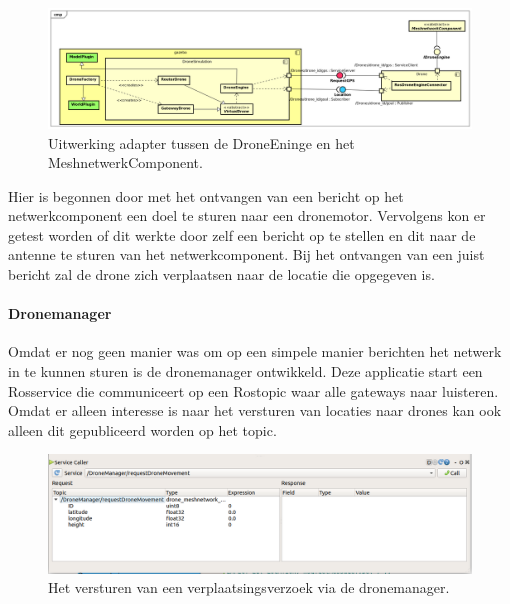 \documentclass[a4paper, 11pt, oneside]{report}
\begin{document}
\begin{figure}[H]
	\begin{center}\includegraphics[width=1\linewidth]{Afbeeldingen/RosEngineAdapater.png}\end{center}
	\caption{Uitwerking adapter tussen de DroneEninge en het MeshnetwerkComponent.}
	\label{fig:adapter}
\end{figure}

Hier is begonnen door met het ontvangen van een bericht op het netwerkcomponent een doel te sturen naar een dronemotor. Vervolgens kon er getest worden of dit werkte door zelf een bericht op te stellen en dit naar de antenne te sturen van het netwerkcomponent. 
Bij het ontvangen van een juist bericht zal de drone zich verplaatsen naar de locatie die opgegeven is.

\paragraph{Dronemanager}
Omdat er nog geen manier was om op een simpele manier berichten het netwerk in te kunnen sturen is de dronemanager ontwikkeld. Deze applicatie start een Rosservice die communiceert op een Rostopic waar alle gateways naar luisteren. Omdat er alleen interesse is naar het versturen van locaties naar drones kan ook alleen dit gepubliceerd worden op het topic.
\begin{figure}[H]
	\begin{center}\includegraphics[width=1\linewidth]{Afbeeldingen/LocationMessageRQT.png}\end{center}
	\caption{Het versturen van een verplaatsingsverzoek via de dronemanager.}
	\label{fig:serviccaller}
\end{figure}
\end{document}
